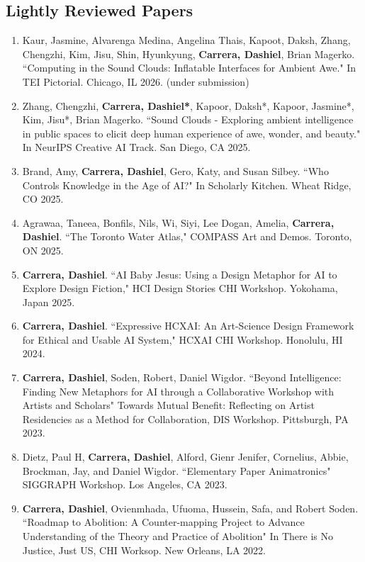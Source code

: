 \subsection{Lightly Reviewed Papers}
\begin{enumerate}

\item Kaur, Jasmine, Alvarenga Medina, Angelina Thais, Kapoot, Daksh, Zhang, Chengzhi, Kim, Jisu, Shin, Hyunkyung, \textbf{Carrera, Dashiel}, Brian Magerko. ``Computing in the Sound Clouds: Inflatable Interfaces for Ambient Awe." In TEI Pictorial. Chicago, IL 2026. (under submission) \\

\item Zhang, Chengzhi, \textbf{Carrera, Dashiel*}, Kapoor, Daksh*, Kapoor, Jasmine*, Kim, Jisu*, Brian Magerko. ``Sound Clouds - Exploring ambient intelligence in public spaces to elicit deep human experience of awe, wonder, and beauty." In NeurIPS Creative AI Track. San Diego, CA 2025.

 \item Brand, Amy, \textbf{Carrera, Dashiel}, Gero, Katy, and Susan Silbey. ``Who Controls Knowledge in the Age of AI?" In Scholarly Kitchen. Wheat Ridge, CO 2025. \\
 \item Agrawaa, Taneea, Bonfils, Nils, Wi, Siyi, Lee Dogan, Amelia, \textbf{Carrera, Dashiel}. ``The Toronto Water Atlas," COMPASS Art and Demos. Toronto, ON 2025. \\
 \item \textbf{Carrera, Dashiel}. ``AI Baby Jesus: Using a Design Metaphor for AI to Explore Design Fiction," HCI Design Stories CHI Workshop. Yokohama, Japan 2025. \\
 \item \textbf{Carrera, Dashiel}. ``Expressive HCXAI: An Art-Science Design Framework for Ethical and Usable AI System," HCXAI CHI Workshop. Honolulu, HI 2024. \\
  \item \textbf{Carrera, Dashiel}, Soden, Robert, Daniel Wigdor. ``Beyond Intelligence: Finding New Metaphors for AI through a Collaborative Workshop with Artists and Scholars" Towards Mutual Benefit: Reflecting on Artist Residencies as a Method for Collaboration, DIS Workshop. Pittsburgh, PA 2023. \\
   \item  Dietz, Paul H, \textbf{Carrera, Dashiel}, Alford, Gienr Jenifer, Cornelius, Abbie, Brockman, Jay, and Daniel Wigdor. ``Elementary Paper Animatronics" SIGGRAPH Workshop. Los Angeles, CA 2023. \\
  \item \textbf{Carrera, Dashiel}, Ovienmhada, Ufuoma, Hussein, Safa, and Robert Soden. ``Roadmap to Abolition: A Counter-mapping Project to Advance Understanding of the Theory and Practice of Abolition" In There is No Justice, Just US, CHI Worksop. New Orleans, LA 2022. 
  \end{enumerate}
  
